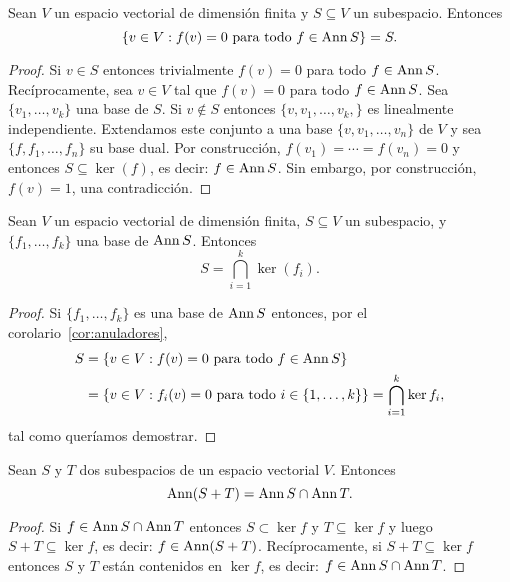 \begin{cor}
	\label{cor:anuladores}
	Sean $V$ un espacio vectorial de dimensión finita y $S\subseteq V$ un
	subespacio. Entonces
	\[
		\{v\in V:f(v)=0\text{ para todo $f\in\operatorname{Ann} S$}\}=S.
	\]

	\begin{proof}
		Si $v\in S$ entonces trivialmente $f(v)=0$ para todo $f\in \operatorname{Ann} S$.
		Recíprocamente, sea $v\in V$ tal que $f(v)=0$ para todo $f\in\operatorname{Ann} S$.  Sea
		$\{v_1,\dots,v_k\}$ una base de $S$. Si $v\not\in S$ entonces
		$\{v,v_1,\dots,v_k,\}$ es linealmente independiente. Extendamos este
		conjunto a una base $\{v,v_1,\dots,v_n\}$ de $V$ y sea
		$\{f,f_1,\dots,f_n\}$ su base dual. Por construcción,
		$f(v_1)=\cdots=f(v_n)=0$ y entonces $S\subseteq\ker(
		f)$, es decir: $f\in\operatorname{Ann} S$. Sin embargo, por construcción,
		$f(v)=1$, una contradicción.
	\end{proof}
\end{cor}

\begin{cor}
	\label{cor:base_annS}
	Sean $V$ un espacio vectorial de dimensión finita, $S\subseteq V$ un
	subespacio, y $\{f_1,\dots,f_k\}$ una base de $\operatorname{Ann} S$. Entonces
	\[
		S=\bigcap_{i=1}^k \ker(f_i).
	\]

	\begin{proof}
		Si $\{f_1,\dots,f_k\}$ es una base de $\operatorname{Ann} S$ entonces, por el
		corolario~\ref{cor:anuladores},
		\begin{align*}
			S &=\{v\in V: f(v)=0\text{ para todo $f\in\operatorname{Ann} S$}\}\\
			&=\{v\in V: f_i(v)=0\text{ para todo $i\in\{1,\dots,k\}$}\}
			=\bigcap_{i=1}^k\ker f_i,
		\end{align*}
		tal como queríamos demostrar.
	\end{proof}
\end{cor}

\begin{prop}
    \label{pro:ann(S+T)}
	Sean $S$ y $T$ dos subespacios de un espacio vectorial $V$. Entonces
	\begin{equation}
		\label{eq:ann(S+T)}
		\operatorname{Ann} (S+T)=\operatorname{Ann} S\cap \operatorname{Ann} T.
	\end{equation}

    \begin{proof}
        Si $f\in\operatorname{Ann} S\cap\operatorname{Ann} T$ entonces $S\subset\ker f$ y
        $T\subseteq\ker f$ y luego $S+T\subseteq\ker f$, es decir: $f\in\operatorname{Ann}(S+T)$.
        Recíprocamente, si $S+T\subseteq\ker f$ entonces $S$ y $T$ están contenidos
        en $\ker f$, es decir: $f\in\operatorname{Ann} S\cap\operatorname{Ann} T$. 
    \end{proof}
\end{prop}

